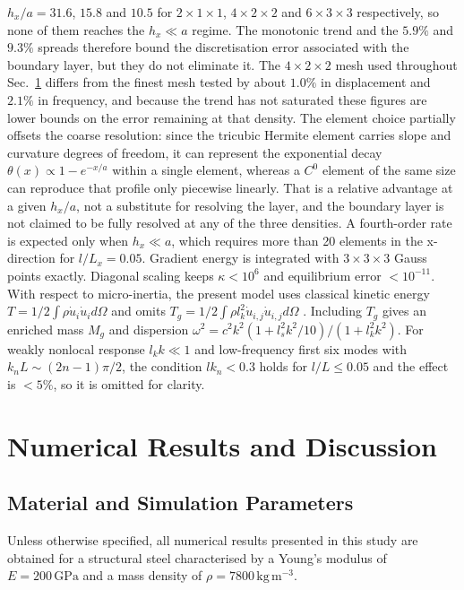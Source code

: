\documentclass[final,3p,times,fleqn]{elsarticle}
\begin{document}
{$h_{x}/a=31.6$, $15.8$ and $10.5$ for $2\times1\times1$, $4\times2\times2$
and $6\times3\times3$ respectively, so none of them reaches the
$h_{x}\ll a$ regime. The monotonic trend and the $5.9\%$ and $9.3\%$
spreads therefore bound the discretisation error associated with the
boundary layer, but they do not eliminate it. The $4\times2\times2$ mesh
used throughout Sec.~\ref{sec:numerical_results} differs from the finest
mesh tested by about $1.0\%$ in displacement and $2.1\%$ in frequency,
and because the trend has not saturated these figures are lower bounds on
the error remaining at that density. The element choice partially offsets
the coarse resolution: since the tricubic Hermite element carries slope
and curvature degrees of freedom, it can represent the exponential decay
$\theta(x)\propto1-e^{-x/a}$ within a single element, whereas a $C^{0}$
element of the same size can reproduce that profile only piecewise
linearly. That is a relative advantage at a given $h_{x}/a$, not a
substitute for resolving the layer, and the boundary layer is not claimed
to be fully resolved at any of the three densities.} A fourth-order rate is expected only when $h_x \ll a$, which requires more than 20 elements in the x-direction for $l/L_x=0.05$. Gradient energy is integrated with $3\times3\times3$ Gauss points exactly. Diagonal scaling keeps $\kappa<10^6$ and equilibrium error $<10^{-11}$. With respect to micro-inertia, the present model uses classical kinetic energy $T=1/2\int\rho\dot{u}_i\dot{u}_i d\Omega$ and omits $T_g=1/2\int\rho l_k^2\dot{u}_{i,j}\dot{u}_{i,j}d\Omega$ \cite{Mindlin1964}. Including $T_g$ gives an enriched mass $M_g$ and dispersion $\omega^2=c^2k^2(1+l_s^2k^2/10)/(1+l_k^2k^2)$. For weakly nonlocal response $l_kk\ll1$ and low-frequency first six modes with $k_nL\sim(2n-1)\pi/2$, the condition $lk_n<0.3$ holds for $l/L\le0.05$ and the effect is $<5\%$, so it is omitted for clarity.


\section{Numerical Results and Discussion}
\label{sec:numerical_results}


\subsection{Material and Simulation Parameters}
\label{sec:materials}

Unless otherwise specified, all numerical results presented in this
study are obtained for a structural steel characterised by a Young's
modulus of $E = 200\,\mathrm{GPa}$ and a mass density of
$\rho = 7800\,\mathrm{kg\,m^{-3}}$.
\end{document}
